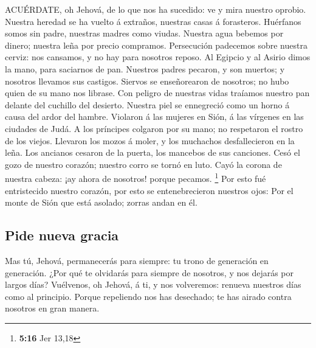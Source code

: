  ACUÉRDATE, oh Jehová, de lo que nos ha sucedido: ve y mira
nuestro oprobio.  Nuestra heredad se ha vuelto á extraños,
nuestras casas á forasteros.  Huérfanos somos sin padre,
nuestras madres como viudas.  Nuestra agua bebemos por
dinero; nuestra leña por precio compramos.  Persecución
padecemos sobre nuestra cerviz: nos cansamos, y no hay para nosotros
reposo.  Al Egipcio y al Asirio dimos la mano, para
saciarnos de pan.  Nuestros padres pecaron, y son muertos; y
nosotros llevamos sus castigos.  Siervos se enseñorearon de
nosotros; no hubo quien de su mano nos librase.  Con peligro
de nuestras vidas traíamos nuestro pan delante del cuchillo del
desierto.  Nuestra piel se ennegreció como un horno á causa
del ardor del hambre.  Violaron á las mujeres en Sión, á
las vírgenes en las ciudades de Judá.  A los príncipes
colgaron por su mano; no respetaron el rostro de los viejos.
 Llevaron los mozos á moler, y los muchachos desfallecieron
en la leña.  Los ancianos cesaron de la puerta, los
mancebos de sus canciones.  Cesó el gozo de nuestro
corazón; nuestro corro se tornó en luto.  Cayó la corona de
nuestra cabeza: ¡ay ahora de nosotros! porque pecamos. \footnote{\textbf{5:16}
  Jer 13,18}  Por esto fué entristecido nuestro corazón,
por esto se entenebrecieron nuestros ojos:  Por el monte de
Sión que está asolado; zorras andan en él.

\hypertarget{pide-nueva-gracia}{%
\subsection{Pide nueva gracia}\label{pide-nueva-gracia}}

 Mas tú, Jehová, permanecerás para siempre: tu trono de
generación en generación.  ¿Por qué te olvidarás para
siempre de nosotros, y nos dejarás por largos días? 
Vuélvenos, oh Jehová, á ti, y nos volveremos: renueva nuestros días como
al principio.  Porque repeliendo nos has desechado; te has
airado contra nosotros en gran manera.
